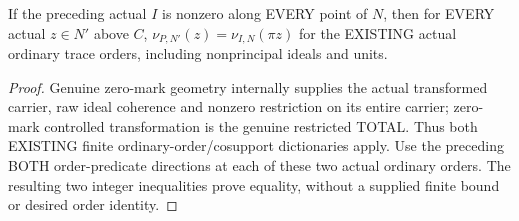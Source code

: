 \begin{theorem}
\label{hir:sharp-actual-curve-raw-total-ordinary-order-above-centre}
\leanok
If the preceding actual $I$ is nonzero along EVERY point of $N$, then
for EVERY actual $z\in N'$ above $C$,
$\nu_{P,N'}(z)=\nu_{I,N}(\pi z)$ for the EXISTING actual ordinary
trace orders, including nonprincipal ideals and units.
\end{theorem}
\begin{proof}
Genuine zero-mark geometry internally supplies the actual transformed
carrier, raw ideal coherence and nonzero restriction on its entire carrier;
zero-mark controlled transformation is the genuine restricted TOTAL.
Thus both EXISTING finite ordinary-order/cosupport dictionaries apply.
Use the preceding BOTH order-predicate directions at each of these two
actual ordinary orders. The resulting two integer inequalities prove
equality, without a supplied finite bound or desired order identity.
\end{proof}

